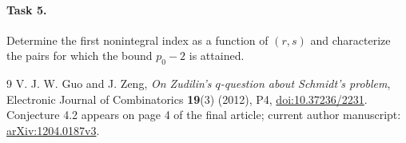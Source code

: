 \documentclass[11pt]{article}
\begin{document}
\paragraph{Task 5.} Determine the first nonintegral index as a function
of $(r,s)$ and characterize the pairs for which the bound $p_0-2$ is attained.

\begin{thebibliography}{9}
 V. J. W. Guo and J. Zeng,
\emph{On Zudilin's $q$-question about Schmidt's problem},
Electronic Journal of Combinatorics \textbf{19}(3) (2012), P4,
\href{https://doi.org/10.37236/2231}{doi:10.37236/2231}.
Conjecture 4.2 appears on page 4 of the final article;
current author manuscript:
\href{https://arxiv.org/abs/1204.0187v3}{arXiv:1204.0187v3}.
\end{thebibliography}
\end{document}
